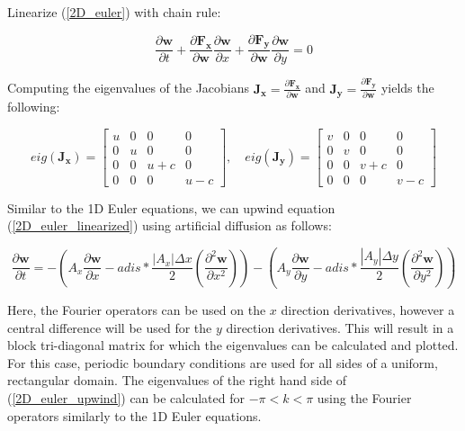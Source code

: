 \documentclass[10pt]{article}
\begin{document}
	Linearize (\ref{2D_euler}) with chain rule:
	
	\begin{equation} \label{2D_euler_linearized}
		\frac{\partial \mathbf{w}}{\partial t} + \frac{\partial \mathbf{F_x}}{\partial \mathbf{w}} \frac{\partial \mathbf{w}}{\partial x} + \frac{\partial \mathbf{F_y}}{\partial \mathbf{w}} \frac{\partial \mathbf{w}}{\partial y}= 0
	\end{equation}
	
	Computing the eigenvalues of the Jacobians $\mathbf{J_x} = \frac{\partial \mathbf{F_x}}{\partial \mathbf{w}}$ and $\mathbf{J_y} = \frac{\partial \mathbf{F_y}}{\partial \mathbf{w}}$ yields the following:
	
		$$eig(\mathbf{J_x}) = 
		\begin{bmatrix}
			u & 0 & 0 & 0\\
			0 & u & 0 & 0\\
			0 & 0 & u+c & 0 \\
			0 & 0 &0 & u-c
		\end{bmatrix}, \quad
		eig(\mathbf{J_y}) = 
		\begin{bmatrix}
			v & 0 & 0 & 0\\
			0 & v & 0 & 0\\
			0 & 0 & v+c & 0 \\
			0 & 0 &0 & v-c
		\end{bmatrix}$$
	
	Similar to the 1D Euler equations, we can upwind equation (\ref{2D_euler_linearized}) using artificial diffusion as follows:
	
	\begin{equation} \label{2D_euler_upwind}
		\frac{\partial \mathbf{w}}{\partial t} = - \left( A_x \frac{\partial \mathbf{w}}{\partial x} - adis * \frac{|A_x| \Delta x}{2} \left( \frac{\partial^2 \mathbf{w}}{\partial x^2} \right) \right) - \left( A_y \frac{\partial \mathbf{w}}{\partial y} - adis * \frac{|A_y| \Delta y}{2} \left( \frac{\partial^2 \mathbf{w}}{\partial y^2} \right) \right)
	\end{equation}
	
	Here, the Fourier operators can be used on the $x$ direction derivatives, however a central difference will be used for the $y$ direction derivatives. This will result in a block tri-diagonal matrix for which the eigenvalues can be calculated and plotted. For this case, periodic boundary conditions are used for all sides of a uniform, rectangular domain. The eigenvalues of the right hand side of (\ref{2D_euler_upwind}) can be calculated for $-\pi<k<\pi$ using the Fourier operators similarly to the 1D Euler equations. 
	
\end{document}
